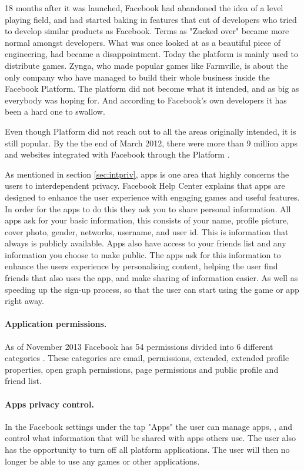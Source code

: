 18 months after it was launched, Facebook had abandoned the idea of a level playing field, and had started baking in features that cut of developers who tried to develop similar products as Facebook. Terms as "Zucked over" became more normal amongst developers. What was once looked at as a beautiful piece of engineering, had became a disappointment. Today the platform is mainly used to distribute games. Zynga, who made popular games like Farmville, is about the only company who have managed to build their whole business inside the Facebook Platform. The platform did not become what it intended, and as big as everybody was hoping for. And according to Facebook's own developers it has been a hard one to swallow. 

Even though Platform did not reach out to all the areas originally intended, it is still popular. By the the end of March 2012, there were more than 9 million apps and websites integrated with Facebook through the Platform \cite{fbPlatform}.

As mentioned in section \ref{sec:intpriv}, apps is one area that highly concerns the users to interdependent privacy. Facebook Help Center \cite{faceHelp} explains that apps are designed to enhance the user experience with engaging games and useful features. In order for the apps to do this they ask you to share personal information. All apps ask for your basic information, this consists of your name, profile picture, cover photo, gender, networks, username, and user id. This is information that always is publicly available. Apps also have access to your friends list and any information you choose to make public. The apps ask for this information to enhance the users experience by personalising content, helping the user find friends that also uses the app, and make sharing of information easier. As well as speeding up the sign-up process, so that the user can start using the game or app right away. 

\paragraph{Application permissions.} As of November 2013 Facebook has 54 permissions divided into 6 different categories \cite{permission}. These categories are email, permissions, extended, extended profile properties, open graph permissions, page permissions and public profile and friend list. 

\paragraph{Apps privacy control.}In the Facebook settings \cite{facebooksettings} under the tap "Apps" the user can manage apps, , and control what information that will be shared with apps others use. The user also has the opportunity to turn off all platform applications. The user will then no longer be able to use any games or other applications.

